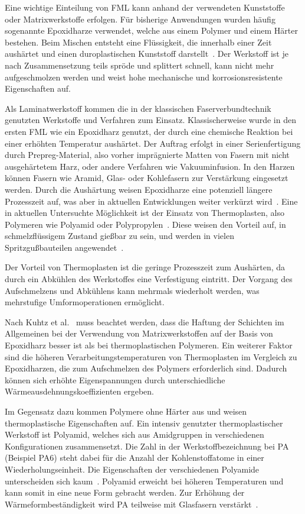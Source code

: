 
Eine wichtige Einteilung von FML kann anhand der verwendeten Kunststoffe oder Matrixwerkstoffe erfolgen.
Für bisherige Anwendungen wurden häufig sogenannte Epoxidharze verwendet, welche aus einem Polymer und einem Härter bestehen.
Beim Mischen entsteht eine Flüssigkeit, die innerhalb einer Zeit aushärtet und einen duroplastischen Kunststoff darstellt~\cite{Dornbusch2015}.
Der Werkstoff ist je nach Zusammensetzung teils spröde und splittert schnell, kann nicht mehr aufgeschmolzen werden und weist hohe mechanische und korrosionsresistente Eigenschaften auf.

Als Laminatwerkstoff kommen die in der klassischen Faserverbundtechnik genutzten Werkstoffe und Verfahren zum Einsatz.
Klassischerweise wurde in den ersten FML wie  ein Epoxidharz genutzt, der durch eine chemische Reaktion bei einer erhöhten Temperatur aushärtet.
Der Auftrag erfolgt in einer Serienfertigung durch Prepreg-Material, also vorher imprägnierte Matten von Fasern mit nicht ausgehärtetem Harz, oder andere Verfahren wie Vakuuminfusion.
In den Harzen können Fasern wie Aramid, Glas- oder Kohlefasern zur Verstärkung eingesetzt werden.
Durch die Aushärtung weisen Epoxidharze eine potenziell längere Prozesszeit auf, was aber in aktuellen Entwicklungen weiter verkürzt wird~\cite{Lakho2017}.
Eine in aktuellen Untersuchte Möglichkeit ist der Einsatz von Thermoplasten, also Polymeren wie Polyamid oder Polypropylen~\cite{Flock2012}.
Diese weisen den Vorteil auf, in schmelzflüssigem Zustand gießbar zu sein, und werden in vielen Spritzgußbauteilen angewendet~\cite{Ehrenstein2003}.

Der Vorteil von Thermoplasten ist die geringe Prozesszeit zum Aushärten, da durch ein Abkühlen des Werkstoffes eine Verfestigung eintritt.
Der Vorgang des Aufschmelzens und Abkühlens kann mehrmals wiederholt werden, was mehrstufige Umformoperationen ermöglicht.

Nach Kuhtz et al.~\cite{Kuhtz2019} muss beachtet werden, dass die Haftung der Schichten im Allgemeinen bei der Verwendung von Matrixwerkstoffen auf der Basis von Epoxidharz besser ist als bei thermoplastischen Polymeren.
Ein weiterer Faktor sind die höheren Verarbeitungstemperaturen von Thermoplasten im Vergleich zu Epoxidharzen, die zum Aufschmelzen des Polymers erforderlich sind.
Dadurch können sich erhöhte Eigenspannungen durch unterschiedliche Wärmeausdehnungskoeffizienten ergeben.

Im Gegensatz dazu kommen Polymere ohne Härter aus und weisen thermoplastische Eigenschaften auf.
Ein intensiv genutzter thermoplastischer Werkstoff ist Polyamid, welches sich aus Amidgruppen in verschiedenen Konfigurationen zusammensetzt.
Die Zahl in der Werkstoffbezeichnung bei PA (Beispiel PA6) steht dabei für die Anzahl der Kohlenstoffatome in einer Wiederholungseinheit.
Die Eigenschaften der verschiedenen Polyamide unterscheiden sich kaum~\cite{Flock2012}.
Polyamid erweicht bei höheren Temperaturen und kann somit in eine neue Form gebracht werden.
Zur Erhöhung der Wärmeformbeständigkeit wird PA teilweise mit Glasfasern verstärkt~\cite{Baur2007}.

